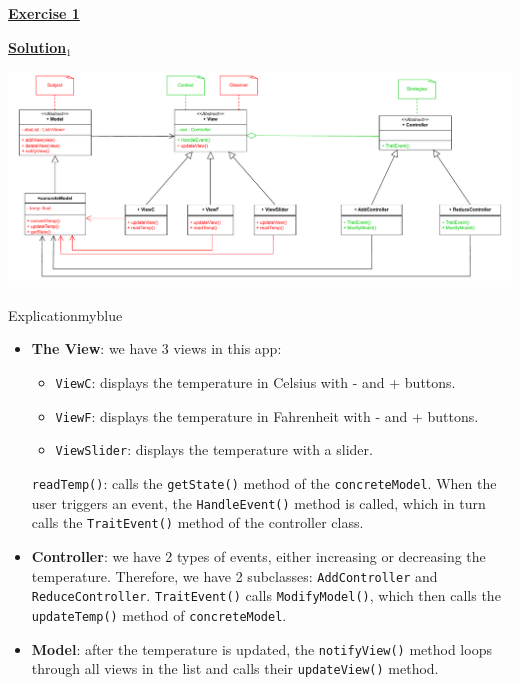 \begin{center}
    \Huge{\textbf{\underline{Exercise 1}}}
\end{center}

\vspace{0.45cm}

\textbf{\underline{Solution\(_1\)}}\\[0.1cm]
\begin{center}
    \includegraphics[height=0.22\textheight]{Exercices/EX1/ex1.1.drawio.pdf}
\end{center}

\vspace{0.25cm}

\begin{prettyBox}{Explication}{myblue}
\begin{itemize}
    \item \textbf{The View}: we have 3 views in this app:
        \begin{itemize}
            \item \texttt{ViewC}: displays the temperature in Celsius with - and + buttons.
            \item \texttt{ViewF}: displays the temperature in Fahrenheit with - and + buttons.
            \item \texttt{ViewSlider}: displays the temperature with a slider.
        \end{itemize}
        \texttt{readTemp()}: calls the \texttt{getState()} method of the \texttt{concreteModel}.  
        When the user triggers an event, the \texttt{HandleEvent()} method is called, which in turn calls the \texttt{TraitEvent()} method of the controller class.

    \item \textbf{Controller}: we have 2 types of events, either increasing or decreasing the temperature. Therefore, we have 
        2 subclasses: \texttt{AddController} and \texttt{ReduceController}.  
        \texttt{TraitEvent()} calls \texttt{ModifyModel()}, which then calls the \texttt{updateTemp()} method of \texttt{concreteModel}.

    \item \textbf{Model}: after the temperature is updated, the \texttt{notifyView()} method loops through all views in the list 
        and calls their \texttt{updateView()} method.
\end{itemize}
\end{prettyBox}

